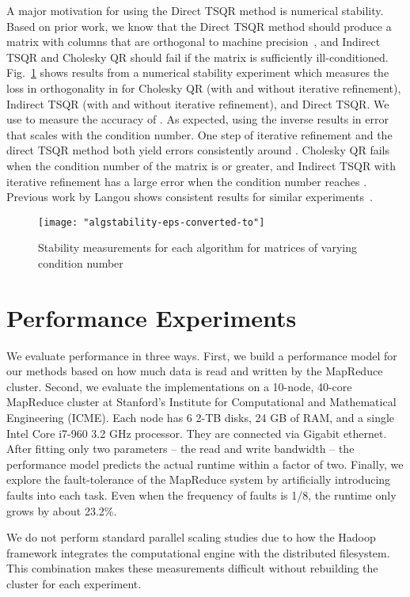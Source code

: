 \documentclass[10pt, conference, compsocconf]{IEEEtran}
\begin{document}
A major motivation for using the Direct TSQR method is numerical stability.  Based on prior work, we know that the Direct TSQR method should produce a matrix  with columns that are orthogonal to machine precision~\cite{demmel-2008-caqr2,Mori-2012-allreduce}, and Indirect TSQR and Cholesky QR should fail if the matrix is sufficiently ill-conditioned.  Fig.~\ref{fig:stability} shows results from a numerical stability experiment which measures the loss in orthogonality in  for Cholesky QR (with and without iterative refinement), Indirect TSQR (with and without iterative refinement),  and Direct TSQR.  We use  to measure the accuracy of .  As expected, using the inverse results in error that scales with the condition number.  One step of iterative refinement and the direct TSQR method both yield errors consistently around .  
Cholesky QR fails when the condition number of the matrix is  or greater, and Indirect TSQR with iterative refinement has a large error when the condition number reaches .  Previous work by Langou shows consistent results for similar experiments~\cite{langou2003-thesis}.

\begin{figure}
\centering
\texttt{[image: "algstability-eps-converted-to"]}
\caption{Stability measurements for each algorithm for matrices of varying condition number}
\label{fig:stability}
\end{figure}

\section{Performance Experiments}\label{sec:perf}

We evaluate performance in three ways.  First, we build a performance model for our methods based on how much data is read and written by the MapReduce cluster.  Second, we evaluate the implementations on a 10-node, 40-core MapReduce cluster at Stanford's Institute for Computational and Mathematical Engineering (ICME).  Each node has 6 2-TB disks, 24 GB of RAM, and a single Intel Core i7-960 3.2 GHz processor.  They are connected via Gigabit ethernet.  After fitting only two parameters -- the read and write bandwidth -- the performance model predicts the actual runtime within a factor of two.  Finally, we explore the fault-tolerance of the MapReduce system by artificially introducing faults into each task.  Even when the frequency of faults is 1/8, the runtime only grows by about 23.2\%.

We do not perform standard parallel scaling studies due to how the Hadoop framework integrates the computational engine with the distributed filesystem. This combination makes these measurements difficult without rebuilding the cluster for each experiment.
\end{document}
